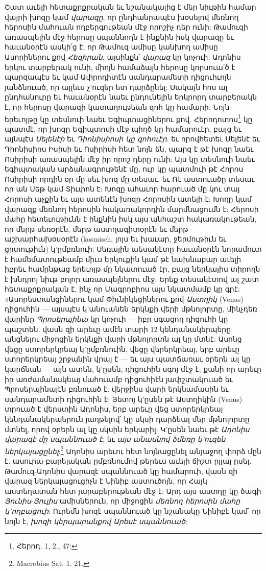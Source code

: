 \documentclass{article}
\begin{document}
{Շատ աւելի հետաքրքրական եւ նշանակալից է մեր նիւթին համար վայրի խոզը կամ \emph{վարազը}, որ ընդհանրապէս խօսելով մեռնող հերոսին մահուան ողբերգութեան մէջ որոշիչ դեր ունի: Թամուզի առասպելին մէջ հերոսը սպաննողն է ինքնին իսկ վարազը եւ հաւանօրէն ասկի՛ց է, որ Թամուզ ամիսը կանխող ամիսը Ասորիներու քով \emph{Հեզիրան}, այսինքն՝ \emph{վարազ} կը կոչուի: Ադոնիս երկու տարբերակ ունի, միոյն համաձայն հերոսը կորսուա՛ծ է պարզապէս եւ կամ Ափրոդիտէն սանդարամետի դիցուհւոյն յանձնուած, որ այլեւս չ'ուզեր ետ դարձընել: Սակայն հոս ալ ընդհանուրը եւ հաւանօրէն նաեւ ընդունելին երկրորդ տարբերակն է, որ հերոսը վարազի կատաղութեան զոհ կը համարի: Նոյն երեւոյթը կը տեսնուի նաեւ Եգիպտացիներու քով. Հերոդոտոս\footnote{Հերոդ. 1, 2., 47:} կը պատմէ, որ խոզը Եգիպտոսի մէջ պիղծ կը համարուէր, բայց եւ այնպէս \emph{Սելենէի} եւ \emph{Դիոնիսիոսի կը զոհուէր}. եւ որովհետեւ Սելենէ եւ Դիոնիսիոս Իսիսի եւ Ոսիրիսի հետ նոյն են, պարզ է թէ խոզը նաեւ Ոսիրիսի առասպելին մէջ իր որոշ դերը ունի: Այս կը տեսնուի նաեւ եգիպտական արձանագրութենէ մը, ուր կը պատմուի թէ Հորոս Ոսիրիսի որդին օր մը սեւ խոզ մը տեսաւ, եւ Ռէ աստուածը տեսաւ որ ան Սեթ կամ Տիւփոն է: Խոզը ահաւոր հարուած մը կու տայ Հորոսի աչքին եւ այս ատենէն խոզը Հորոսին ատելի է: Խողը կամ վարազք մեռնող հերոսին հակառակորդին մարմնացումն է: Հերոսի մահը հետեւութիւնն է ինքնին իսկ այս անհաշտ հակառակութեան, որ մերթ սեռօրէն, մերթ աստղագիտօրէն եւ մերթ աշխարհախօսօրէն (kosmisch, լոյս եւ խաւար, ջերմութիւն եւ ցրտութիւն) կ'ըմբռնուի: Սեռային աեսակէտը հաւանօրէն նորամուտ է համեմատութեամբ միւս երկուքին կամ թէ նախնաբար աւելի իբրեւ համընթաց երեւոյթ մը նկատուած էր, բայց ներկայիս տիրողն է խնդրոյ նիւթ բոլոր առասպելներու մէջ: Երեք տեսակէտով ալ շատ հետաքրքրական է, ինչ որ Մագրոբիոս այս նկատմամբ կը գրէ: «Ասորեստանցիներու կամ Փիւնիկեցիներու քով \emph{Աստղիկ} (Venus) դիցուհին — այսպէս կ'անուանեն երկնքի վերի մթնոլորտը, մինչդեռ վարինը \emph{Պրոսերպինա} կը կոչուի — իբր սգացող դիցուհի կը պաշտեն. վասն զի արեւը ամէն տարի 12 կենդանակերպերը անցնելու միջոցին երկնքի վարի մթնոլորտն ալ կը մտնէ: Ասոնց վեցը ստորերկրեայ կ'ըմբռնուին, վեցը վերերկրեայ, երբ արեւը ստորերկրեայ շրջանին վրայ է — եւ այս պատճառաւ օրերն ալ կը կարճնան — այն ատեն, կ'ըսեն, դիցուհին սգոյ մէջ է, քանի որ արեւը իր առժամանակեայ մահուամբ դիցուհիէն յափշտակուած եւ Պրոսերպինայէն բռնուած է. վերջինս վարի երկնամասին եւ սանդարամետի դիցուհին է: Յետոյ կ'ըսեն թէ Աստղիկին (Venus) տրուած է վերստին Ադոնիս, երբ արեւը վեց ստորերկրեայ կենդանակերպերուն յաղթելով՝ կը սկսի դարձեալ մեր մթնոլորտը մտնել, որով օրերն ալ կը սկսին երկարիլ: Կ'ըսեն նաեւ թէ \emph{Ադոնիս վարազէ մը սպաննուած է}, եւ \emph{այս անասնով ձմեռը կ'ուզեն ներկայացընել}:\footnote{Macrobius Sat. 1. 21.} Ադոնիս արեւու հետ նոյնացընել անյաջող փորձ մըն է. ասուրա-բարելական ըմբռնումով թերեւս աւելի ճիշտ ըլլայ ըսել. Թամուզ-Ադոնիս վարազէ սպաննուած կը համարուի, վասն զի վարազ ներկայացուցիչն է Նինիբ աստուծոյն, որ Հայկ աստեղատան հետ յարաբերութեան մէջ է: Արդ այս աստղը կը ծագի \emph{Յունիս}-\emph{Յուլիս} ամիսներուն, որ միջոցին \emph{մեռնող հերոսին մահը կ'ողբացուի}: Ուրեմն խոզէ սպաննուած կը նշանակը Նինիբէ կամ՝ որ նոյն է, \emph{խոզի կերպարանքով Արեսէ սպաննուած}:

}
\end{document}
